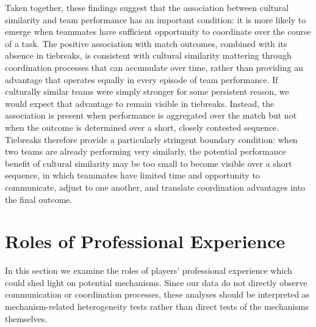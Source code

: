 \documentclass[10pt]{article}
\begin{document}

Taken together, these findings suggest that the association between cultural similarity and team performance has an important condition: it is more likely to emerge when teammates have sufficient opportunity to coordinate over the course of a task. The positive association with match outcomes, combined with its absence in tiebreaks, is consistent with cultural similarity mattering through coordination processes that can accumulate over time, rather than providing an advantage that operates equally in every episode of team performance. If culturally similar teams were simply stronger for some persistent reason, we would expect that advantage to remain visible in tiebreaks. Instead, the association is present when performance is aggregated over the match but not when the outcome is determined over a short, closely contested sequence. Tiebreaks therefore provide a particularly stringent boundary condition: when two teams are already performing very similarly, the potential performance benefit of cultural similarity may be too small to become visible over a short sequence, in which teammates have limited time and opportunity to communicate, adjust to one another, and translate coordination advantages into the final outcome.





\section{Roles of Professional Experience}

In this section we examine the roles of players’ professional experience which could shed light on potential mechanisms. Since our data do not directly observe communication or coordination processes, these analyses should be interpreted as mechanism-related heterogeneity tests rather than direct tests of the mechanisms themselves. %

\end{document}
